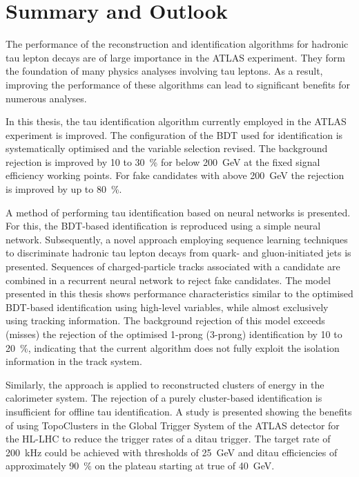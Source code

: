 \chapter{Summary and Outlook}
\label{sec:conclusion}

The performance of the reconstruction and identification algorithms for hadronic
tau lepton decays are of large importance in the ATLAS experiment. They form the
foundation of many physics analyses involving tau leptons. As a result,
improving the performance of these algorithms can lead to significant benefits
for numerous analyses.

In this thesis, the tau identification algorithm currently employed in the ATLAS
experiment is improved. The configuration of the BDT used for identification is
systematically optimised and the variable selection revised. The background
rejection is improved by \num{10} to \SI{30}{\percent} for \tauhadvis \pt below
\SI{200}{\GeV} at the fixed signal efficiency working points. For fake
\tauhadvis candidates with \pt above \SI{200}{\GeV} the rejection is improved by
up to \SI{80}{\percent}.

A method of performing tau identification based on neural networks is presented.
For this, the BDT-based identification is reproduced using a simple neural
network. Subsequently, a novel approach employing sequence learning techniques
to discriminate hadronic tau lepton decays from quark- and gluon-initiated jets
is presented. Sequences of charged-particle tracks associated with a \tauhadvis
candidate are combined in a recurrent neural network to reject fake \tauhadvis
candidates. The model presented in this thesis shows performance characteristics
similar to the optimised BDT-based identification using high-level variables,
while almost exclusively using tracking information. The background rejection of
this model exceeds (misses) the rejection of the optimised 1-prong (3-prong)
identification by \num{10} to \SI{20}{\percent}, indicating that the current
algorithm does not fully exploit the isolation information in the track system.

Similarly, the approach is applied to reconstructed clusters of energy in the
calorimeter system. The rejection of a purely cluster-based identification is
insufficient for offline tau identification. A study is presented showing the
benefits of using TopoClusters in the Global Trigger System of the ATLAS
detector for the HL-LHC to reduce the trigger rates of a ditau trigger. The
target rate of \SI{200}{\kilo\hertz} could be achieved with \tauhadvis \pt
thresholds of \SI{25}{\GeV} and ditau efficiencies of approximately
\SI{90}{\percent} on the plateau starting at true \tauhadvis \pt of
\SI{40}{\GeV}.

